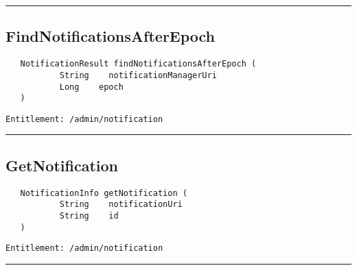 \rule{12cm}{2pt}
\subsection{FindNotificationsAfterEpoch}
\label{Api:FindNotificationsAfterEpoch}
\begin{Verbatim}
   NotificationResult findNotificationsAfterEpoch (
           String    notificationManagerUri
           Long    epoch
   )
\end{Verbatim}
\begin{Verbatim}[formatcom=\color{Maroon}]
  Entitlement: /admin/notification
\end{Verbatim}



\rule{12cm}{2pt}
\subsection{GetNotification}
\label{Api:GetNotification}
\begin{Verbatim}
   NotificationInfo getNotification (
           String    notificationUri
           String    id
   )
\end{Verbatim}
\begin{Verbatim}[formatcom=\color{Maroon}]
  Entitlement: /admin/notification
\end{Verbatim}



\rule{12cm}{2pt}
